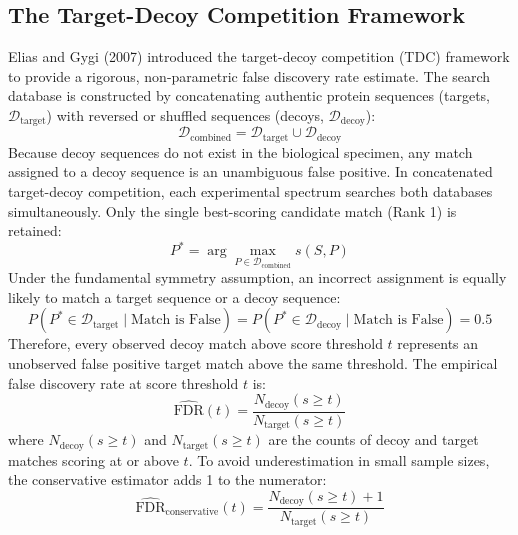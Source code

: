 \documentclass[11pt,twoside,openright]{book}
\begin{document}
\subsection{The Target-Decoy Competition Framework}
Elias and Gygi (2007) \cite{elias2007target} introduced the target-decoy competition (TDC) framework to provide a rigorous, non-parametric false discovery rate estimate. The search database is constructed by concatenating authentic protein sequences (targets, $\mathcal{D}_{\text{target}}$) with reversed or shuffled sequences (decoys, $\mathcal{D}_{\text{decoy}}$):
\begin{equation}
\mathcal{D}_{\text{combined}} = \mathcal{D}_{\text{target}} \cup \mathcal{D}_{\text{decoy}}
\label{eq:target_decoy_db}
\end{equation}
Because decoy sequences do not exist in the biological specimen, any match assigned to a decoy sequence is an unambiguous false positive. In concatenated target-decoy competition, each experimental spectrum searches both databases simultaneously. Only the single best-scoring candidate match (Rank 1) is retained:
\begin{equation}
P^* = \arg\max_{P \in \mathcal{D}_{\text{combined}}} s(S, P)
\label{eq:rank1_match}
\end{equation}
Under the fundamental symmetry assumption, an incorrect assignment is equally likely to match a target sequence or a decoy sequence:
\begin{equation}
P(P^* \in \mathcal{D}_{\text{target}} \mid \text{Match is False}) = P(P^* \in \mathcal{D}_{\text{decoy}} \mid \text{Match is False}) = 0.5
\label{eq:symmetry_assumption}
\end{equation}
Therefore, every observed decoy match above score threshold $t$ represents an unobserved false positive target match above the same threshold. The empirical false discovery rate at score threshold $t$ is:
\begin{equation}
\widehat{\text{FDR}}(t) = \frac{N_{\text{decoy}}(s \ge t)}{N_{\text{target}}(s \ge t)}
\label{eq:empirical_fdr}
\end{equation}
where $N_{\text{decoy}}(s \ge t)$ and $N_{\text{target}}(s \ge t)$ are the counts of decoy and target matches scoring at or above $t$. To avoid underestimation in small sample sizes, the conservative estimator adds 1 to the numerator:
\begin{equation}
\widehat{\text{FDR}}_{\text{conservative}}(t) = \frac{N_{\text{decoy}}(s \ge t) + 1}{N_{\text{target}}(s \ge t)}
\label{eq:conservative_fdr}
\end{equation}
\end{document}
